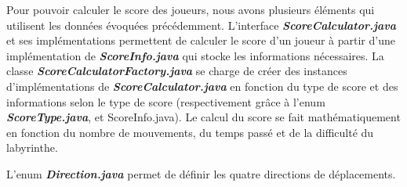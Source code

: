Pour pouvoir calculer le score des joueurs, nous avons plusieurs éléments qui
utilisent les données évoquées précédemment. L'interface \textbf{\textit{ScoreCalculator.java}}
et ses implémentations permettent de calculer le score d'un joueur à partir
d'une implémentation de \textbf{\textit{ScoreInfo.java}} qui stocke les informations
nécessaires. La classe \textbf{\textit{ScoreCalculatorFactory.java}} se charge de créer des
instances d'implémentations de \textbf{\textit{ScoreCalculator.java}} en fonction du type de
score et des informations selon le type de score (respectivement grâce à l'enum
\textbf{\textit{ScoreType.java}}, et ScoreInfo.java). Le calcul du score se fait
mathématiquement en fonction du nombre de mouvements, du temps passé et de la
difficulté du labyrinthe.

L'enum \textbf{\textit{Direction.java}} permet de définir les quatre directions de déplacements.
